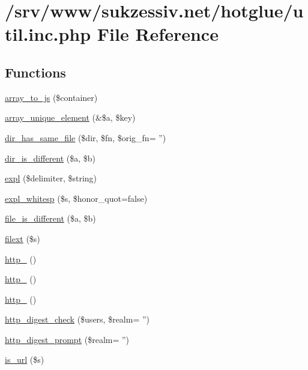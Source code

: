\hypertarget{util_8inc_8php}{
\section{/srv/www/sukzessiv.net/hotglue/util.inc.php File Reference}
\label{util_8inc_8php}
}
\subsection*{Functions}
\begin{CompactItemize}
\item 
\hyperlink{util_8inc_8php_61d3b2881d9368741c71509017724bc8}{array\_\-to\_\-js} (\$container)
\item 
\hyperlink{util_8inc_8php_4647462c98447c6c2842f70d8c313f85}{array\_\-unique\_\-element} (\&\$a, \$key)
\item 
\hyperlink{util_8inc_8php_7f3e06b0a6f405290cb4d7990b8ac5c6}{dir\_\-has\_\-same\_\-file} (\$dir, \$fn, \$orig\_\-fn= '')
\item 
\hyperlink{util_8inc_8php_6309f576f2611237288d0dd3eed09db3}{dir\_\-is\_\-different} (\$a, \$b)
\item 
\hyperlink{util_8inc_8php_afce787d4b725ac62be6306ff3e352e7}{expl} (\$delimiter, \$string)
\item 
\hyperlink{util_8inc_8php_1d2500a5e237e59956b03cbea845c95a}{expl\_\-whitesp} (\$s, \$honor\_\-quot=false)
\item 
\hyperlink{util_8inc_8php_9c9a81ec9dba8b2870cbb365f8139866}{file\_\-is\_\-different} (\$a, \$b)
\item 
\hyperlink{util_8inc_8php_6d9392e51344c2e8720a0c1982ebea21}{filext} (\$s)
\item 
\hyperlink{util_8inc_8php_78288ca93c62ce2b5ef34f40352c7324}{http\_} ()
\item 
\hyperlink{util_8inc_8php_24f09c2c8205022b013bbee5293a38ae}{http\_} ()
\item 
\hyperlink{util_8inc_8php_575cc91d803ae46bbc5dfaecbeb3561d}{http\_} ()
\item 
\hyperlink{util_8inc_8php_ff065fbc9f3abbf9c5a0ebfba22acbf7}{http\_\-digest\_\-check} (\$users, \$realm= '')
\item 
\hyperlink{util_8inc_8php_95d221746e2d296434b0d63f78cedf57}{http\_\-digest\_\-prompt} (\$realm= '')
\item 
\hyperlink{util_8inc_8php_0da48011cb68c039aec396c23cb04295}{is\_\-url} (\$s)
\item 

\end{CompactItemize}
